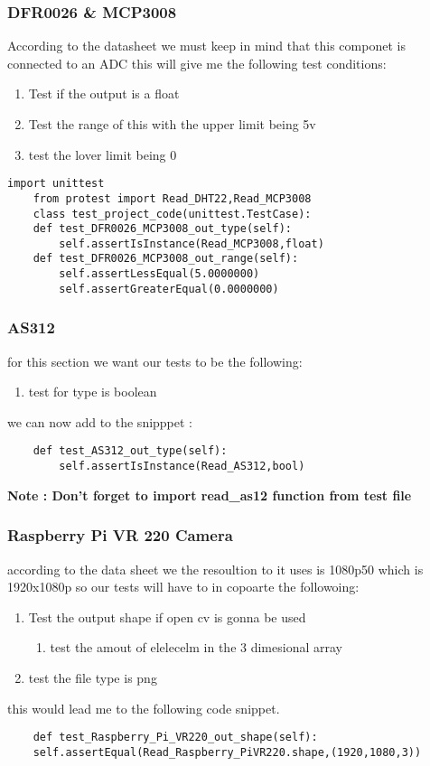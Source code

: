 \subsubsection{DFR0026 \& MCP3008}
According to the  datasheet \cite{ada} we must keep in mind  that this  componet is  connected to  an ADC 
this  will  give  me  the  following  test conditions:
\begin{enumerate}
    \item Test if  the output is a float

    \item Test  the  range of this  with the  upper limit being 5v 
    \item test the  lover limit being 0 
\end{enumerate}
\begin{lstlisting}[style=mystyle,caption={unit test for  DFR0026 and  MCP3008}]
    import unittest
    from protest import Read_DHT22,Read_MCP3008
    class test_project_code(unittest.TestCase):
    def test_DFR0026_MCP3008_out_type(self):
        self.assertIsInstance(Read_MCP3008,float)
    def test_DFR0026_MCP3008_out_range(self):
        self.assertLessEqual(5.0000000)
        self.assertGreaterEqual(0.0000000)
\end{lstlisting}
\subsubsection{AS312}
for  this section  we  want our  tests  to  be  the following:
\begin{enumerate}
    \item test for type is boolean 
\end{enumerate}
we can  now add to the snipppet :
\begin{lstlisting}
    def test_AS312_out_type(self):
        self.assertIsInstance(Read_AS312,bool)
\end{lstlisting}
\textbf{Note : Don't forget to import read_as12 function from test file}

\subsubsection{Raspberry Pi VR 220 Camera}
according to the  data sheet \cite{Camera}
we the  resoultion to  it uses is  1080p50 which is 1920x1080p so our  tests will have to  in copoarte  the  followoing:
\begin{enumerate}
    \item Test the  output shape  if open cv is  gonna  be  used 
    \begin{enumerate}
        \item test  the  amout of   elelecelm in the  3 dimesional   array 
    \end{enumerate}
    \item test the  file  type  is png
\end{enumerate}
this would lead me to the following code snippet.
\begin{lstlisting}
    def test_Raspberry_Pi_VR220_out_shape(self):
    self.assertEqual(Read_Raspberry_PiVR220.shape,(1920,1080,3))
\end{lstlisting}
